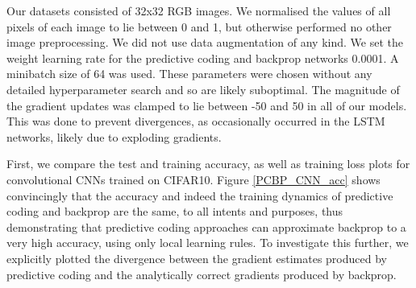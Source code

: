 Our datasets consisted of 32x32 RGB images. We normalised the values of all pixels of each image to lie between 0 and 1, but otherwise performed no other image preprocessing. We did not use data augmentation of any kind. We set the weight learning rate for the predictive coding and backprop networks 0.0001. A minibatch size of 64 was used. These parameters were chosen without any detailed hyperparameter search and so are likely suboptimal. The magnitude of the gradient updates was clamped to lie between -50 and 50 in all of our models. This was done to prevent divergences, as occasionally occurred in the LSTM networks, likely due to exploding gradients. 

First, we compare the test and training accuracy, as well as training loss plots for convolutional CNNs trained on CIFAR10. Figure \ref{PCBP_CNN_acc} shows convincingly that the accuracy and indeed the training dynamics of predictive coding and backprop are the same, to all intents and purposes, thus demonstrating that predictive coding approaches can approximate backprop to a very high accuracy, using only local learning rules. To investigate this further, we explicitly plotted the divergence between the gradient estimates produced by predictive coding and the analytically correct gradients produced by backprop.


